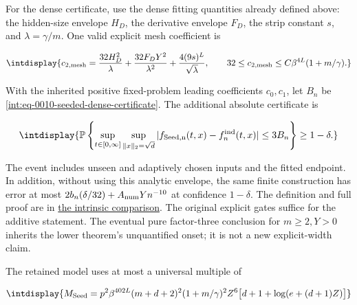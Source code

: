 
For the dense certificate, use the dense fitting quantities already defined above: the hidden-size envelope \(H_D\), the derivative envelope \(F_D\), the strip constant \(s\), and \(\lambda=\gamma/m\). One valid explicit mesh coefficient is


\begingroup\renewcommand{\theHequation}{intdisplay.208}
\begin{equation}
\intdisplay{
c_{2,\rm mesh}=
\frac{32H_D^2}{\lambda}+
\frac{32F_DY^2}{\lambda^2}+
\frac{4(9s)^L}{\sqrt\lambda},\qquad
32\le c_{2,\rm mesh}\le C\beta^{4L}(1+m/\gamma).
}
\label{int:eq-0091-seeded-mesh-coefficient}
\end{equation}
\endgroup


With the inherited positive fixed-problem leading coefficients \(c_0,\allowbreak c_1\), let \(B_n\) be \eqref{int:eq-0010-seeded-dense-certificate}. The additional absolute certificate is


\begingroup\renewcommand{\theHequation}{intdisplay.209}
\begin{equation}
\intdisplay{
\mathbb P\left\{
\sup_{t\in[0,\infty]}\sup_{\|x\|_2=\sqrt d}
|f_{\rm Seed,n}(t,x)-f_n^{\rm ind}(t,x)|\le3B_n
\right\}\ge1-\delta.
}
\label{int:eq-0092-seeded-complete-comparison}
\end{equation}
\endgroup


The event includes unseen and adaptively chosen inputs and the fitted endpoint. In addition, without using this analytic envelope, the same finite construction has error at most \(2b_n(\delta/32)+A_{\rm num}Yn^{-10}\) at confidence \(1-\delta\). The definition and full proof are in \hyperref[int:intrinsic-variability-comparison]{the intrinsic comparison}. The original explicit gates suffice for the additive statement. The eventual pure factor-three conclusion for \(m\ge2,\allowbreak Y>0\) inherits the lower theorem's unquantified onset; it is not a new explicit-width claim.



The retained model uses at most a universal multiple of


\begingroup\renewcommand{\theHequation}{intdisplay.210}
\begin{equation}
\intdisplay{
M_{\rm Seed}=p^2\beta^{402L}(m+d+2)^2(1+m/\gamma)^2Z^6
\bigl[d+1+\log(e+(d+1)Z)\bigr]
}
\label{int:eq-0093-seeded-retained-words}
\end{equation}
\endgroup

